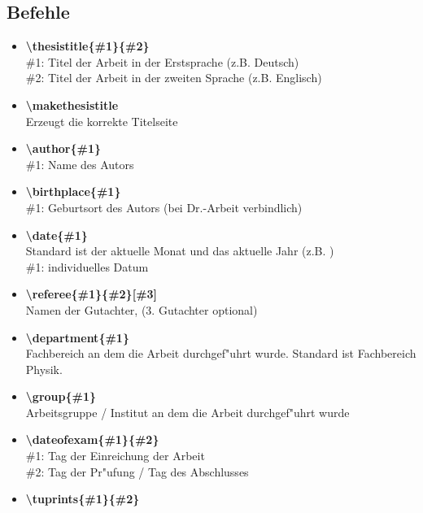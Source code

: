   \subsection{Befehle}
    \begin{itemize}\parsep
      \item \textbf{\textbackslash thesistitle\{\#1\}\{\#2\}}\\
        \#1: Titel der Arbeit in der Erstsprache (z.B. Deutsch)\\
        \#2: Titel der Arbeit in der zweiten Sprache (z.B. Englisch)
      \item \textbf{\textbackslash makethesistitle}\\
        Erzeugt die korrekte Titelseite
      \item \textbf{\textbackslash author\{\#1\}}\\
        \#1: Name des Autors
      \item \textbf{\textbackslash birthplace\{\#1\}}\\
        \#1: Geburtsort des Autors (bei Dr.-Arbeit verbindlich)
      \item \textbf{\textbackslash date\{\#1\}}\\
        Standard ist der aktuelle Monat und das aktuelle Jahr (z.B. \getmydate)\\
        \#1: individuelles Datum
      \item \textbf{\textbackslash referee\{\#1\}\{\#2\}[\#3]}\\
        Namen der Gutachter, (3. Gutachter optional)
      \item \textbf{\textbackslash department\{\#1\}}\\
        Fachbereich an dem die Arbeit durchgef"uhrt wurde. Standard ist
        \glqq Fachbereich Physik\grqq.
      \item \textbf{\textbackslash group\{\#1\}}\\
        Arbeitsgruppe / Institut an dem die Arbeit durchgef"uhrt wurde
      \item \textbf{\textbackslash dateofexam\{\#1\}\{\#2\}}\\
        \#1: Tag der Einreichung der Arbeit\\
        \#2: Tag der Pr"ufung / Tag des Abschlusses\\
      \item \textbf{\textbackslash tuprints\{\#1\}\{\#2\}}\\

\end{itemize}
